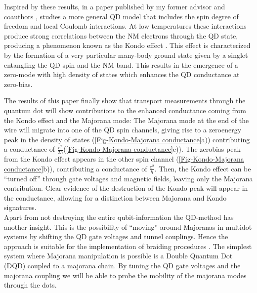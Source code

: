 Inspired by these results, in a paper published by my former advisor
and coauthors \citep{ruiz-tijerina_interaction_2015}, \citeauthor{ruiz-tijerina_interaction_2015}
studies a more general QD model that includes the spin degree of freedom
and local Coulomb interactions. At low temperatures these interactions produce strong correlations
between the NM electrons through the QD state, producing a phenomenon
known as the Kondo effect \citep{hewson_kondo_1997}. This effect
is characterized by the formation of a very particular many-body ground state given by
a singlet entangling the QD spin and the NM band. This results in the emergence of a zero-mode with high density of states which enhances the QD conductance at zero-bias.


The results of this paper finally show that transport measurements
through the quantum dot will show contributions to the enhanced conductance
coming from the Kondo effect and the Majorana mode: The Majorana mode
at the end of the wire will migrate into one of the QD spin channels,
giving rise to a zero\textendash energy peak in the density of states
(\ref{Fig-Kondo-Majorana conductance}a)) contributing a conductance
of $\frac{e^{2}}{2h}$(\ref{Fig-Kondo-Majorana conductance}c)). The
zero\textendash bias peak from the Kondo effect appears in the other
spin channel (\ref{Fig-Kondo-Majorana conductance}b)), contributing
a conductance of $\frac{e^{2}}{h}$. Then, the Kondo effect can be
\textquotedblleft turned off\textquotedblright{} through gate voltages
and magnetic fields, leaving only the Majorana contribution. Clear
evidence of the destruction of the Kondo peak will appear in the conductance,
allowing for a distinction between Majorana and Kondo signatures.\\



 Apart from not destroying the entire qubit-information the QD-method has another insight.  This is the possibility of “moving” around Majoranas  in multidot systems by shifting the QD gate voltages and tunnel couplings. Hence the approach is suitable for the implementation of braiding procedures . The simplest system where Majorana manipulation is possible is  a  Double Quantum Dot (DQD) coupled to a majorana chain. By tuning the QD gate voltages and the majorana coupling we will be able to probe the mobility of the majorana modes through the dots. 
 

